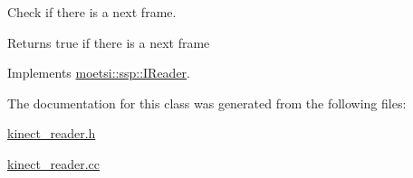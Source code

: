 Check if there is a next frame. 

\begin{DoxyReturn}{Returns}
true if there is a next frame 
\end{DoxyReturn}


Implements \hyperlink{classmoetsi_1_1ssp_1_1IReader_af9186ba41e136dc4ec3242b5dd55fa04}{moetsi\+::ssp\+::\+I\+Reader}.



The documentation for this class was generated from the following files\+:\begin{DoxyCompactItemize}
\item 
\hyperlink{kinect__reader_8h}{kinect\+\_\+reader.\+h}\item 
\hyperlink{kinect__reader_8cc}{kinect\+\_\+reader.\+cc}\end{DoxyCompactItemize}
